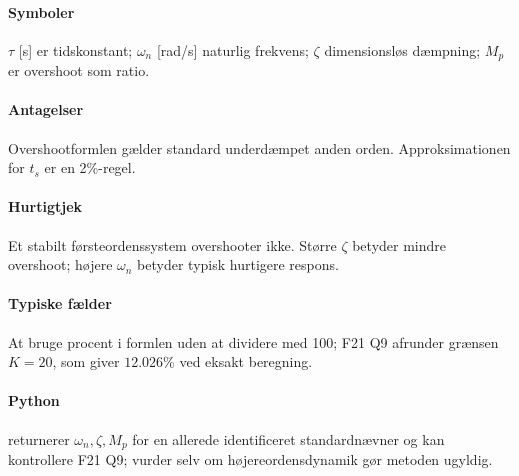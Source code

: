 \paragraph{Symboler}
\(\tau\) [s] er tidskonstant; \(\omega_n\) [rad/s] naturlig frekvens;
\(\zeta\) dimensionsløs dæmpning; \(M_p\) er overshoot som ratio.

\paragraph{Antagelser}
Overshootformlen gælder standard underdæmpet anden orden. Approksimationen for
\(t_s\) er en 2\%-regel.

\paragraph{Hurtigtjek}
Et stabilt førsteordenssystem overshooter ikke. Større \(\zeta\) betyder mindre
overshoot; højere \(\omega_n\) betyder typisk hurtigere respons.

\paragraph{Typiske fælder}
At bruge procent i formlen uden at dividere med 100; F21 Q9 afrunder grænsen
\(K=20\), som giver \(12.026\%\) ved eksakt beregning.

\paragraph{Python}
 returnerer
\(\omega_n,\zeta,M_p\) for en allerede identificeret standardnævner og kan kontrollere
F21 Q9; vurder selv om højereordensdynamik gør metoden ugyldig.
